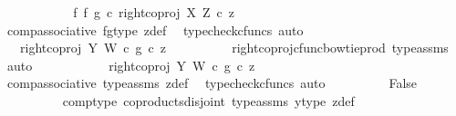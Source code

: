 \begin{isabellebody}
\ \ \ \ \ \ \isamarkupfalse%
\ \isamarkupfalse%
\ {\isachardoublequoteopen}{\isachardot}{\kern0pt}{\isachardot}{\kern0pt}{\isachardot}{\kern0pt}\ {\isacharequal}{\kern0pt}\ {\isacharparenleft}{\kern0pt}{\isacharparenleft}{\kern0pt}f\ {\isasymbowtie}\isactrlsub f\ g{\isacharparenright}{\kern0pt}\ {\isasymcirc}\isactrlsub c\ right{\isacharunderscore}{\kern0pt}coproj\ X\ Z{\isacharparenright}{\kern0pt}\ {\isasymcirc}\isactrlsub c\ z{\isachardoublequoteclose}\isanewline
\ \ \ \ \ \ \ \ \isamarkupfalse%
\ comp{\isacharunderscore}{\kern0pt}associative{}\ fg{\isacharunderscore}{\kern0pt}type\ z{\isacharunderscore}{\kern0pt}def\ \isamarkupfalse%
\ {\isacharparenleft}{\kern0pt}typecheck{\isacharunderscore}{\kern0pt}cfuncs{\isacharcomma}{\kern0pt}\ auto{\isacharparenright}{\kern0pt}\isanewline
\ \ \ \ \ \ \isamarkupfalse%
\ \isamarkupfalse%
\ {\isachardoublequoteopen}{\isachardot}{\kern0pt}{\isachardot}{\kern0pt}{\isachardot}{\kern0pt}\ {\isacharequal}{\kern0pt}\ {\isacharparenleft}{\kern0pt}right{\isacharunderscore}{\kern0pt}coproj\ Y\ W\ {\isasymcirc}\isactrlsub c\ g{\isacharparenright}{\kern0pt}\ {\isasymcirc}\isactrlsub c\ z{\isachardoublequoteclose}\isanewline
\ \ \ \ \ \ \ \ \isamarkupfalse%
\ right{\isacharunderscore}{\kern0pt}coproj{\isacharunderscore}{\kern0pt}cfunc{\isacharunderscore}{\kern0pt}bowtie{\isacharunderscore}{\kern0pt}prod\ type{\isacharunderscore}{\kern0pt}assms\ \isamarkupfalse%
\ auto\isanewline
\ \ \ \ \ \ \isamarkupfalse%
\ \isamarkupfalse%
\ {\isachardoublequoteopen}{\isachardot}{\kern0pt}{\isachardot}{\kern0pt}{\isachardot}{\kern0pt}\ {\isacharequal}{\kern0pt}\ right{\isacharunderscore}{\kern0pt}coproj\ Y\ W\ {\isasymcirc}\isactrlsub c\ g\ {\isasymcirc}\isactrlsub c\ z{\isachardoublequoteclose}\isanewline
\ \ \ \ \ \ \ \ \isamarkupfalse%
\ comp{\isacharunderscore}{\kern0pt}associative{}\ type{\isacharunderscore}{\kern0pt}assms{\isacharparenleft}{\kern0pt}{}{\isacharparenright}{\kern0pt}\ z{\isacharunderscore}{\kern0pt}def\ \isamarkupfalse%
\ {\isacharparenleft}{\kern0pt}typecheck{\isacharunderscore}{\kern0pt}cfuncs{\isacharcomma}{\kern0pt}\ auto{\isacharparenright}{\kern0pt}\isanewline
\ \ \ \ \ \ \isamarkupfalse%
\ \isamarkupfalse%
\ False\isanewline
\ \ \ \ \ \ \ \ \isamarkupfalse%
\ comp{\isacharunderscore}{\kern0pt}type\ coproducts{\isacharunderscore}{\kern0pt}disjoint\ type{\isacharunderscore}{\kern0pt}assms{\isacharparenleft}{\kern0pt}{}{\isacharparenright}{\kern0pt}\ y{\isacharunderscore}{\kern0pt}type{}\ z{\isacharunderscore}{\kern0pt}def\ \isamarkupfalse%

\end{isabellebody}
